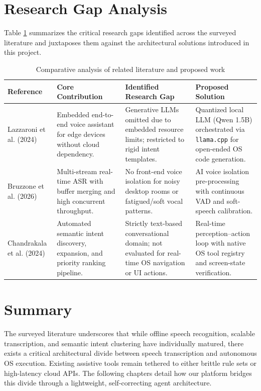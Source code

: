 \documentclass[12pt,a4paper]{report}
\begin{document}
\section{Research Gap Analysis}
Table \ref{tab:lit_survey_comparison} summarizes the critical research gaps identified across the surveyed literature and juxtaposes them against the architectural solutions introduced in this project.

\begin{table}[h!]
	\centering
	\caption{Comparative analysis of related literature and proposed work}
	\label{tab:lit_survey_comparison}
	\vspace*{8pt}
	\begin{tabular}{p{2.5cm} p{4.2cm} p{4.5cm} p{3.8cm}}
		\toprule
		\textbf{Reference} & \textbf{Core Contribution} & \textbf{Identified Research Gap} & \textbf{Proposed Solution} \\
		\midrule
		Lazzaroni et al. \cite{lazzaroni2024embedded} (2024) & Embedded end-to-end voice assistant for edge devices without cloud dependency. & Generative LLMs omitted due to embedded resource limits; restricted to rigid intent templates. & Quantized local LLM (Qwen 1.5B) orchestrated via \texttt{llama.cpp} for open-ended OS code generation. \\
		\addlinespace
		Bruzzone et al. \cite{bruzzone2026sink} (2026) & Multi-stream real-time ASR with buffer merging and high concurrent throughput. & No front-end voice isolation for noisy desktop rooms or fatigued/soft vocal patterns. & AI voice isolation pre-processing with continuous VAD and soft-speech calibration. \\
		\addlinespace
		Chandrakala et al. \cite{chandrakala2024intent} (2024) & Automated semantic intent discovery, expansion, and priority ranking pipeline. & Strictly text-based conversational domain; not evaluated for real-time OS navigation or UI actions. & Real-time perception--action loop with native OS tool registry and screen-state verification. \\
		\bottomrule
	\end{tabular}
\end{table}

\section{Summary}
The surveyed literature underscores that while offline speech recognition, scalable transcription, and semantic intent clustering have individually matured, there exists a critical architectural divide between speech transcription and autonomous OS execution. Existing assistive tools remain tethered to either brittle rule sets or high-latency cloud APIs. The following chapters detail how our platform bridges this divide through a lightweight, self-correcting agent architecture.
\end{document}
